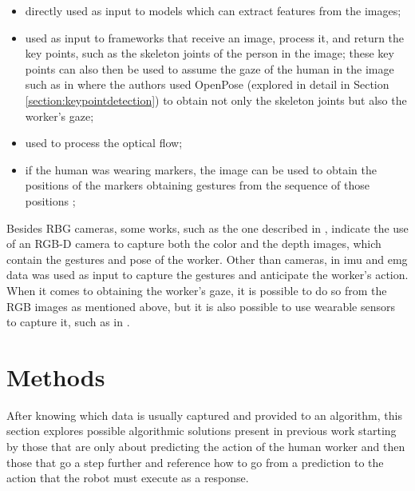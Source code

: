 \begin{itemize}
\item directly used as input to models which can extract features from the images;

\item used as input to frameworks that receive an image, process it, and return the key points, such as the skeleton joints of the person in the image; these key points can also then be used to assume the gaze of the human in the image such as in \textcite{Canuto2021} where the authors used OpenPose (explored in detail in Section \ref{section:keypointdetection}) to obtain not only the skeleton joints but also the worker's gaze;

\item used to process the optical flow\cite{Gammulle2019, Wu2021, Rodriguez2019, Furnari2021};

\item if the human was wearing markers, the image can be used to obtain the positions of the markers obtaining gestures from the sequence of those positions \cite{Maeda2016};
\end{itemize}

Besides RBG cameras, some works, such as the one described in \textcite{Moutinho2023}, indicate the use of an RGB-D camera to capture both the color and the depth images, which contain the gestures and pose of the worker. Other than cameras, in \textcite{Tortora2019} \acs{imu} and \acs{emg} data was used as input to capture the gestures and anticipate the worker's action. When it comes to obtaining the worker's gaze, it is possible to do so from the RGB images as mentioned above, but it is also possible to use wearable sensors to capture it, such as in \textcite{Schydlo2018}.

\section{Methods}


After knowing which data is usually captured and provided to an algorithm, this section explores possible algorithmic solutions present in previous work starting by those that are only about predicting the action of the human worker and then those that go a step further and reference how to go from a prediction to the action that the robot must execute as a response.

